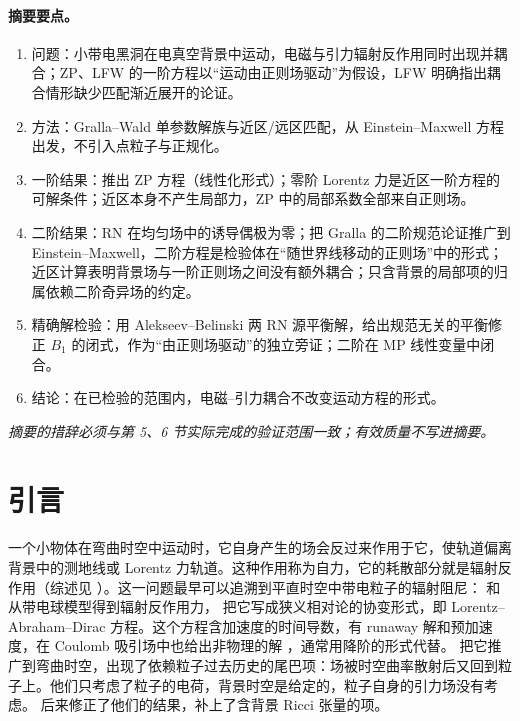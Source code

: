 \documentclass[11pt,a4paper]{ctexart}
\begin{document}
\paragraph{摘要要点。}
\begin{enumerate}[nosep]
\item 问题：小带电黑洞在电真空背景中运动，电磁与引力辐射反作用同时出现并耦合；ZP、LFW 的一阶方程以“运动由正则场驱动”为假设，LFW 明确指出耦合情形缺少匹配渐近展开的论证。
\item 方法：Gralla--Wald 单参数解族与近区/远区匹配，从 Einstein--Maxwell 方程出发，不引入点粒子与正规化。
\item 一阶结果：推出 ZP 方程（线性化形式）；零阶 Lorentz 力是近区一阶方程的可解条件；近区本身不产生局部力，ZP 中的局部系数全部来自正则场。
\item 二阶结果：RN 在均匀场中的诱导偶极为零；把 Gralla 的二阶规范论证推广到 Einstein--Maxwell，二阶方程是检验体在“随世界线移动的正则场”中的形式；近区计算表明背景场与一阶正则场之间没有额外耦合；只含背景的局部项的归属依赖二阶奇异场的约定。
\item 精确解检验：用 Alekseev--Belinski 两 RN 源平衡解，给出规范无关的平衡修正 $B_1$ 的闭式，作为“由正则场驱动”的独立旁证；二阶在 MP 线性变量中闭合。
\item 结论：在已检验的范围内，电磁--引力耦合不改变运动方程的形式。
\end{enumerate}
\emph{摘要的措辞必须与第 5、6 节实际完成的验证范围一致；有效质量不写进摘要。}

\section{引言}\label{sec:intro}

一个小物体在弯曲时空中运动时，它自身产生的场会反过来作用于它，使轨道偏离背景中的测地线或 Lorentz 力轨道。这种作用称为自力，它的耗散部分就是辐射反作用（综述见 \citealt{PoissonPoundVega2011,BarackPound2019}）。这一问题最早可以追溯到平直时空中带电粒子的辐射阻尼：\citet{Abraham1905} 和 \citet{Lorentz1909} 从带电球模型得到辐射反作用力，\citet{Dirac1938} 把它写成狭义相对论的协变形式，即 Lorentz--Abraham--Dirac 方程。这个方程含加速度的时间导数，有 runaway 解和预加速度，在 Coulomb 吸引场中也给出非物理的解 \citep{Eliezer1943}，通常用降阶的形式代替。\citet{DeWittBrehme1960} 把它推广到弯曲时空，出现了依赖粒子过去历史的尾巴项：场被时空曲率散射后又回到粒子上。他们只考虑了粒子的电荷，背景时空是给定的，粒子自身的引力场没有考虑。\citet{Hobbs1968} 后来修正了他们的结果，补上了含背景 Ricci 张量的项。
\end{document}
